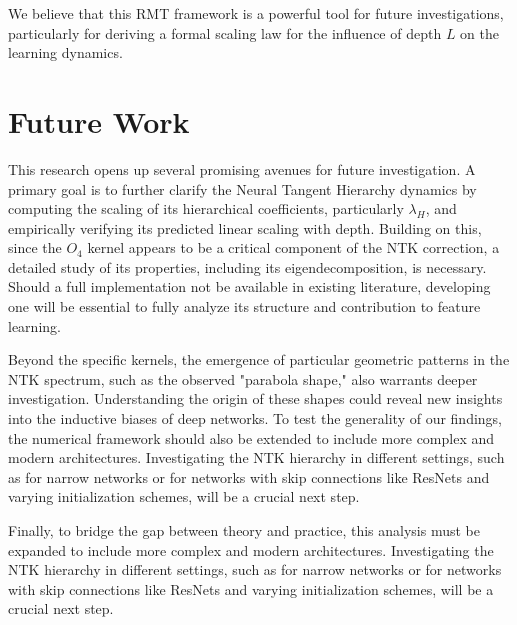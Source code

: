 \documentclass[a4paper]{article}
\begin{document}
We believe that this RMT framework is a powerful tool for future investigations, particularly for deriving a formal scaling law for the influence of depth $L$ on the learning dynamics.


\section{Future Work}
This research opens up several promising avenues for future investigation. A primary goal is to further clarify the Neural Tangent Hierarchy dynamics by computing the scaling of its hierarchical coefficients, particularly $\lambda_H$, and empirically verifying its predicted linear scaling with depth. Building on this, since the $O_4$ kernel appears to be a critical component of the NTK correction, a detailed study of its properties, including its eigendecomposition, is necessary. Should a full implementation not be available in existing literature, developing one will be essential to fully analyze its structure and contribution to feature learning.

Beyond the specific kernels, the emergence of particular geometric patterns in the NTK spectrum, such as the observed "parabola shape," also warrants deeper investigation. Understanding the origin of these shapes could reveal new insights into the inductive biases of deep networks. To test the generality of our findings, the numerical framework should also be extended to include more complex and modern architectures. Investigating the NTK hierarchy in different settings, such as for narrow networks or for networks with skip connections like ResNets and varying initialization schemes, will be a crucial next step.

Finally, to bridge the gap between theory and practice, this analysis must be expanded to include more complex and modern architectures. Investigating the NTK hierarchy in different settings, such as for narrow networks or for networks with skip connections like ResNets and varying initialization schemes, will be a crucial next step.
\end{document}
